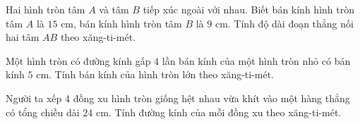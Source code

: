 \begin{ex} %
Hai hình tròn tâm $A$ và tâm $B$ tiếp xúc ngoài với nhau. Biết bán kính hình tròn tâm $A$ là $15\text{ cm}$, bán kính hình tròn tâm $B$ là $9\text{ cm}$. Tính độ dài đoạn thẳng nối hai tâm $AB$ theo xăng-ti-mét.
\end{ex}

\begin{ex} %
Một hình tròn có đường kính gấp $4$ lần bán kính của một hình tròn nhỏ có bán kính $5\text{ cm}$. Tính bán kính của hình tròn lớn theo xăng-ti-mét.
\end{ex}

\begin{ex} %
Người ta xếp 4 đồng xu hình tròn giống hệt nhau vừa khít vào một hàng thẳng có tổng chiều dài $24\text{ cm}$. Tính đường kính của mỗi đồng xu theo xăng-ti-mét.
\end{ex}
